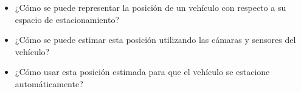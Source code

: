
\begin{itemize}
    \item ¿Cómo se puede representar la posición de un vehículo con respecto a su espacio de estacionamiento?
    \item ¿Cómo se puede estimar esta posición utilizando las cámaras y sensores del vehículo?
    \item ¿Cómo usar esta posición estimada para que el vehículo se estacione automáticamente?
\end{itemize}